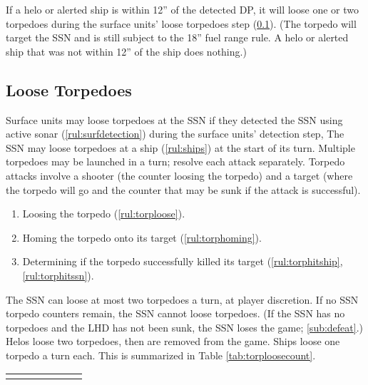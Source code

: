 \documentclass[../TacSubMicroRules.tex]{subfiles}
\begin{document}
 
If a helo or alerted ship is within 12'' of the detected DP, it will loose one or two torpedoes during the surface units' loose torpedoes step (\ref{sub:loose_torpedoes}).
(The torpedo will target the SSN and is still subject to the 18'' fuel range rule.
A helo or alerted ship that was not within 12'' of the ship does nothing.)

\subsection{Loose Torpedoes}%
\label{sub:loose_torpedoes}

Surface units may loose torpedoes at the SSN if they detected the SSN using active sonar (\ref{rul:surfdetection}) during the surface units' detection step,
The SSN may loose torpedoes at a ship (\ref{rul:ships}) at the start of its turn.
Multiple torpedoes may be launched in a turn; resolve each attack separately.
Torpedo attacks involve a shooter (the counter loosing the torpedo) and a target (where the torpedo will go and the counter that may be sunk if the attack is successful).
\begin{enumerate}
    \item Loosing the torpedo (\ref{rul:torploose}).
    \item Homing the torpedo onto its target (\ref{rul:torphoming}).
    \item Determining if the torpedo successfully killed its target (\ref{rul:torphitship}, \ref{rul:torphitssn}).
\end{enumerate}

 
The SSN can loose at most two torpedoes a turn, at player discretion.
If no SSN torpedo counters remain, the SSN cannot loose torpedoes.
(If the SSN has no torpedoes and the LHD has not been sunk, the SSN loses the game; \ref{sub:defeat}.)
Helos loose two torpedoes, then are removed from the game.
Ships loose one torpedo a turn each.
This is summarized in Table \ref{tab:torploosecount}.
\begin{Table}
    \centering
    \begin{tabular}{R{0.15\linewidth}|L{0.65\linewidth}}
        \hline
        \hline
        \hline
        \hline
    \end{tabular}
    \label{tab:torploosecount}
\end{Table}
\end{document}
